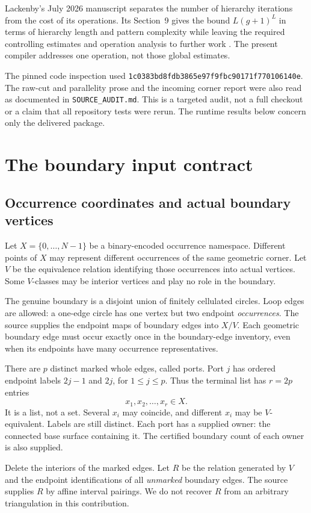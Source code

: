 \documentclass[11pt]{article}
\theoremstyle{definition}\newtheorem{definition}[theorem]{Definition}\newtheorem{example}[theorem]{Example}
\theoremstyle{remark}\newtheorem{remark}[theorem]{Remark}
\newcommand{\code}[1]{\texttt{#1}}
\newcommand{\snapshot}{\texttt{1c0383bd8fdb3865e97f9fbc90171f770106140e}}
\begin{document}
Lackenby's July 2026 manuscript separates the number of hierarchy iterations from the cost of its operations. Its Section~9 gives the bound $L(g+1)^L$ in terms of hierarchy length and pattern complexity while leaving the required controlling estimates and operation analysis to further work \cite{lackenby}. The present compiler addresses one operation, not those global estimates.

The pinned code inspection used \snapshot. The raw-cut and parallelity prose and the incoming corner report were also read as documented in \code{SOURCE\_AUDIT.md}. This is a targeted audit, not a full checkout or a claim that all repository tests were rerun. The runtime results below concern only the delivered package.

\section{The boundary input contract}
\label{sec:model}
\subsection{Occurrence coordinates and actual boundary vertices}
Let $X=\{0,\ldots,N-1\}$ be a binary-encoded occurrence namespace. Different points of $X$ may represent different occurrences of the same geometric corner. Let $V$ be the equivalence relation identifying those occurrences into actual vertices. Some $V$-classes may be interior vertices and play no role in the boundary.

The genuine boundary is a disjoint union of finitely cellulated circles. Loop edges are allowed: a one-edge circle has one vertex but two endpoint \emph{occurrences}. The source supplies the endpoint maps of boundary edges into $X/V$. Each geometric boundary edge must occur exactly once in the boundary-edge inventory, even when its endpoints have many occurrence representatives.

There are $p$ distinct marked whole edges, called ports. Port $j$ has ordered endpoint labels $2j-1$ and $2j$, for $1\le j\le p$. Thus the terminal list has $r=2p$ entries
\[
                    x_1,x_2,\ldots,x_r\in X.
\]
It is a list, not a set. Several $x_i$ may coincide, and different $x_i$ may be $V$-equivalent. Labels are still distinct. Each port has a supplied owner: the connected base surface containing it. The certified boundary count of each owner is also supplied.

Delete the interiors of the marked edges. Let $R$ be the relation generated by $V$ and the endpoint identifications of all \emph{unmarked} boundary edges. The source supplies $R$ by affine interval pairings. We do not recover $R$ from an arbitrary triangulation in this contribution.
\end{document}
